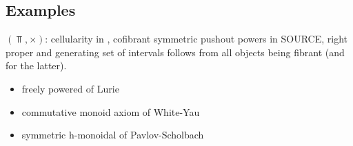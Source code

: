 \documentclass[a4paper,10pt
]{article}%
\renewcommand{\1}{\ensuremath{\mathbb{id}}}
\begin{document}
\subsection{Examples}





\begin{example}
      $(\Top,\times)$:
      cellularity in \cite{Pia91},
      cofibrant symmetric pushout powers in {\color{red} SOURCE},
      right proper and generating set of intervals follows from all objects being fibrant (and \cite[Lemma 2.1]{BM13} for the latter).
\end{example}

\begin{itemize}
\item freely powered of Lurie
\item commutative monoid axiom of White-Yau
\item symmetric h-monoidal of Pavlov-Scholbach
\end{itemize}




\end{document}
